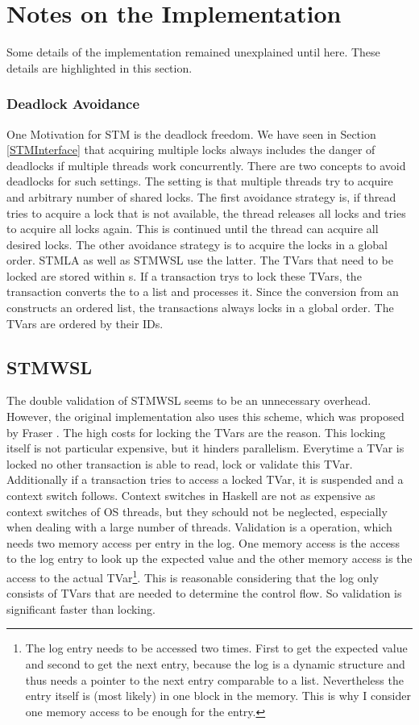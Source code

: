 \section{Notes on the Implementation}
Some details of the implementation remained unexplained until here. These details are highlighted
in this section.

\subsubsection{Deadlock Avoidance}
One Motivation for STM is the deadlock freedom. We have seen in Section \ref{STMInterface} that acquiring 
multiple locks always includes the danger of deadlocks if multiple threads work concurrently. 
There are two concepts to avoid deadlocks for such settings. The setting is that multiple threads
try to acquire and arbitrary number of shared locks. The first avoidance strategy is, if thread tries to 
acquire a lock that is not available, the thread releases all locks and tries to acquire all locks again.
This is continued until the thread can acquire all desired locks. The other avoidance strategy is to 
acquire the locks in a global order. STMLA as well as STMWSL use the latter. The TVars that need to be 
locked are stored within s. If a transaction trys to lock these TVars, the transaction converts 
the  to a list and processes it. Since the conversion from an  constructs an ordered 
list, the transactions always locks in a global order. The TVars are ordered by their IDs.


\subsection{STMWSL}
The double validation of STMWSL seems to be an unnecessary overhead. However, the original implementation 
also uses this scheme, which was proposed by Fraser \parencite[Page 42]{lockfreedom}. The high costs for locking the TVars
are the reason. This locking itself is not particular expensive, but it hinders parallelism.
Everytime a TVar is locked no other transaction is able to read, lock or validate this TVar. Additionally if 
a transaction tries to access a locked TVar, it is suspended and a context switch follows. Context switches in Haskell 
are not as expensive as context switches of OS threads, but they schould not be neglected, especially when dealing
with a large number of threads. Validation is a operation, which needs two memory access per entry in the log.
One memory access is the access to the log entry to look up the expected value and the other memory access is
the access to the actual TVar\footnote{The log entry needs to be accessed two times. First to get the expected
value and second to get the next entry, because the log is a dynamic structure and thus needs a pointer
to the next entry comparable to a list. Nevertheless the entry itself is (most likely) in one block in the memory.
This is why I consider one memory access to be enough for the entry.}. This is reasonable considering that the 
log only consists of TVars that are needed to determine the control flow. So validation is significant faster
than locking. 


